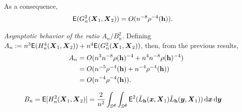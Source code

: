 \documentclass{article}
\begin{document}
As a consequence,
\begin{align*}
    \mathsf{E} (G_n^2(\boldsymbol{X}_1,\boldsymbol{X}_2)) &= O(n^{-8} \rho^{-4}(\mathbf h)).
\end{align*}

\textit{Asymptotic behavior of the ratio $A_n / B_n^2$.} Defining $A_n := n^3 \mathsf{E} (H_n^4(\boldsymbol{X}_1, \boldsymbol{X}_2)) + n^4 \mathsf{E} (G_n^2(\boldsymbol{X}_1,\boldsymbol{X}_2))$, then, from the previous results,
\begin{align*}
    A_n &= O(n^3 n^{-8}\rho(\mathbf h)^{-4} + n^4 n^{-8}\rho(\mathbf h)^{-4}) \\
    &= O(n^{-5} \rho^{-4}(\mathbf h)+n^{-4} \rho^{-4}(\mathbf h))\\
    &= O(n^{-4} \rho^{-4}(\mathbf h)).
\end{align*}

\begin{align*}
    B_n &= \mathsf{E}[H_n^2(\boldsymbol{X}_1,\boldsymbol{X}_2)]=\frac{2}{n^2} \int_{\mathbb{S}^{\boldsymbol{d}}} \int_{\mathbb{S}^{\boldsymbol{d}}} \mathsf{E}^2 ( \bar{L}_{\mathbf h} (\boldsymbol{x},\boldsymbol{X}_1) \bar{L}_{\mathbf h} (\boldsymbol{y},\boldsymbol{X}_1) ) \,\mathrm{d} \boldsymbol{x} \,\mathrm{d} \boldsymbol{y}
\end{align*}
\end{document}
